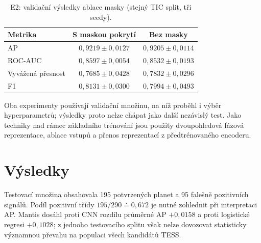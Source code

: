 \documentclass[11pt,a4paper]{article}
\begin{document}
\begin{table}[H]
\centering\small
\caption{E2: validační výsledky ablace masky (stejný TIC split, tři seedy).}
\label{tab:e2}
\begin{tabular}{lcc}
\toprule
Metrika & S maskou pokrytí & Bez masky \\
\midrule
AP & $0{,}9219\pm0{,}0127$ & $0{,}9205\pm0{,}0114$ \\
ROC-AUC & $0{,}8597\pm0{,}0054$ & $0{,}8532\pm0{,}0193$ \\
Vyvážená přesnost & $0{,}7685\pm0{,}0428$ & $0{,}7832\pm0{,}0296$ \\
F1 & $0{,}8131\pm0{,}0300$ & $0{,}7994\pm0{,}0493$ \\
\bottomrule
\end{tabular}
\end{table}

Oba experimenty používají validační množinu, na níž proběhl i výběr hyperparametrů; výsledky proto nelze chápat jako další nezávislý test. Jako techniky nad rámec základního trénování jsou použity dvoupohledová fázová reprezentace, ablace vstupů a přenos reprezentací z předtrénovaného encoderu.

\section{Výsledky}
\begin{table}[H]
\centering\small
\caption{Jednorázový test na 290 signálech; neurální modely: průměr $\pm$ výběrová směrodatná odchylka pro tři seedy.}
\label{tab:results}
\end{table}

Testovací množina obsahovala 195 potvrzených planet a 95 falešně pozitivních signálů. Podíl pozitivní třídy $195/290\doteq0{,}672$ je nutné zohlednit při interpretaci AP. Mantis dosáhl proti CNN rozdílu průměrné AP $+0{,}0158$ a proti logistické regresi $+0{,}1028$; z jednoho testovacího splitu však nelze dovozovat statisticky významnou převahu na populaci všech kandidátů TESS.
\end{document}
